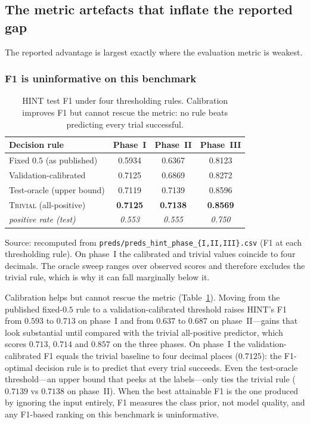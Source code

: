 \documentclass[a4paper,fleqn]{cas-sc}
\begin{document}
\subsection{The metric artefacts that inflate the reported gap}
The reported advantage is largest exactly where the evaluation metric is weakest.
\subsubsection{F1 is uninformative on this benchmark}
\label{sec:f1}
\begin{table}[t]
\centering
\small
\caption{HINT test F1 under four thresholding rules. Calibration improves F1 but cannot rescue the metric: no rule beats predicting every trial successful.}
\label{tab:f1}
\begin{tabular}{lccc}
\toprule
Decision rule & Phase~I & Phase~II & Phase~III \\
\midrule
Fixed $0.5$ (as published) & 0.5934 & 0.6367 & 0.8123 \\
Validation-calibrated & 0.7125 & 0.6869 & 0.8272 \\
Test-oracle (upper bound) & 0.7119 & 0.7139 & 0.8596 \\
\textsc{Trivial} (all-positive) & \textbf{0.7125} & \textbf{0.7138} & \textbf{0.8569} \\
\emph{positive rate (test)} & \emph{0.553} & \emph{0.555} & \emph{0.750} \\
\bottomrule
\end{tabular}
\begin{minipage}{\linewidth}\vspace{2pt}\scriptsize Source: recomputed from \texttt{preds/preds\_hint\_phase\_\{I,II,III\}.csv} (F1 at each thresholding rule). On phase~I the calibrated and trivial values coincide to four decimals. The oracle sweep ranges over observed scores and therefore excludes the trivial rule, which is why it can fall marginally below it. \end{minipage}
\end{table}
Calibration helps but cannot rescue the metric (Table~\ref{tab:f1}). Moving from the
published fixed-$0.5$ rule to a validation-calibrated threshold raises HINT's F1 from
$0.593$ to $0.713$ on phase~I and from $0.637$ to $0.687$ on phase~II---gains that look
substantial until compared with the trivial all-positive predictor, which scores $0.713$,
$0.714$ and $0.857$ on the three phases. On phase~I the validation-calibrated F1 equals the
trivial baseline to four decimal places ($0.7125$): the F1-optimal decision rule is to
predict that every trial succeeds. Even the test-oracle threshold---an upper bound that
peeks at the labels---only ties the trivial rule ($0.7139$ vs $0.7138$ on phase~II). When
the best attainable F1 is the one produced by ignoring the input entirely, F1 measures the
class prior, not model quality, and any F1-based ranking on this benchmark is uninformative.
\end{document}
